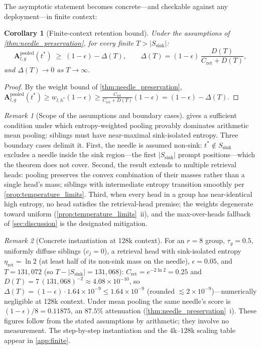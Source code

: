 \documentclass[final,5p,times,twocolumn]{elsarticle}
\newtheorem{corollary}{Corollary}
\theoremstyle{definition}
\theoremstyle{remark}
\newtheorem{remark}{Remark}
\newcommand{\AttnPool}[2]{\mathbf{A}^{\mathrm{pooled}}_{#1,#2}}
\newcommand{\Ssink}{S_{\mathrm{sink}}}
\begin{document}
The asymptotic statement becomes concrete---and checkable against any
deployment---in finite context:

\begin{corollary}[Finite-context retention bound]
\label{cor:finite_context_bound}
Under the assumptions of \cref{thm:needle_preservation}, for every
finite $T>|\Ssink|$:
\begin{equation}
  \AttnPool{l}{g}(t^{*}) \;\ge\; (1-\epsilon) - \Delta(T),
  \qquad
  \Delta(T) = (1-\epsilon)\,
    \frac{D(T)}{C_{\mathrm{ret}} + D(T)},
  \label{eq:finite_context_delta}
\end{equation}
and $\Delta(T)\to0$ as $T\to\infty$.
\end{corollary}

\begin{proof}
By the weight bound of \cref{thm:needle_preservation},
 $\AttnPool{l}{g}(t^{*})\ge w_{l,h^{*}}(1-\epsilon)
\ge\frac{C_{\mathrm{ret}}}{C_{\mathrm{ret}}+D(T)}(1-\epsilon)
=(1-\epsilon)-\Delta(T)$.
\end{proof}

\begin{remark}[Scope of the assumptions and boundary cases]
\label{rem:assumptions}
 gives a sufficient condition under which
entropy-weighted pooling provably dominates arithmetic mean pooling:
siblings must have near-maximal sink-isolated entropy. Three boundary
cases delimit it. First, the needle is assumed non-sink:
 $t^{*}\notin\Ssink$ excludes a needle inside the sink region---the
first $|\Ssink|$ prompt positions---which the theorem does not cover.
Second, the result extends to multiple retrieval heads: pooling
preserves the convex combination of their masses rather than a single
head's mass; siblings with intermediate entropy transition smoothly per
\cref{prop:temperature_limits}. Third, when every head in a group has
near-identical high entropy, no head satisfies the retrieval-head
premise; the weights degenerate toward uniform
(\cref{prop:temperature_limits}~ii), and the max-over-heads fallback of
\cref{sec:discussion} is the designated mitigation.
\end{remark}

\begin{remark}[Concrete instantiation at 128k context]
\label{rem:instantiate}
For an $r=8$ group, $\tau_g=0.5$, uniformly diffuse siblings ($c_j=0$),
a retrieval head with sink-isolated entropy
 $\eta_{\mathrm{ret}}=\ln 2$ (at least half of its non-sink mass on the
needle), $\epsilon=0.05$, and $T=131{,}072$ (so
 $T-|\Ssink|=131{,}068$): $C_{\mathrm{ret}}=e^{-2\ln 2}=0.25$ and
 $D(T)=7\,(131{,}068)^{-2}\approx 4.08\times 10^{-10}$, so
 $\Delta(T)=(1-\epsilon)\cdot 1.64\times 10^{-9}\le 1.64\times 10^{-9}$ (rounded $\lesssim 2\times 10^{-9}$)---numerically negligible at 128k
context. Under mean pooling the same needle's score is
 $(1-\epsilon)/8=0.11875$, an $87.5\%$ attenuation
(\cref{thm:needle_preservation}~i). These figures follow from the
stated assumptions by arithmetic; they involve no measurement. The
step-by-step instantiation and the $4$k--$128$k scaling table appear in
\cref{app:finite}.
\end{remark}
\end{document}
